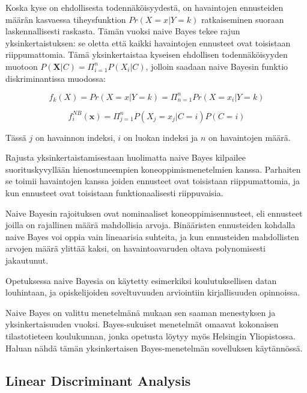 \documentclass[finnish,twoside,openright]{HYgraduMLDS}
\begin{document}
Koska kyse on ehdollisesta todennäköisyydestä, on havaintojen ennusteiden määrän kasvaessa tiheysfunktion $Pr(X = x | Y = k)$ ratkaiseminen suoraan laskennallisesti raskasta. Tämän vuoksi naive Bayes tekee rajun yksinkertaistuksen: se oletta että kaikki havaintojen ennusteet ovat toisistaan riippumattomia. Tämä yksinkertaistaa kyseisen ehdollisen todennäköisyyden muotoon $P(\textbf{X}|C) = \Pi^n_{i=1} P(X_i | C)$, jolloin saadaan naive Bayesin funktio diskriminantissa muodossa:

\begin{equation}
    f_k(X) = Pr(X = x | Y = k) = \Pi^n_{n=1} Pr(X = x_i | Y = k)
\end{equation}

\begin{equation}
    f^{NB}_i(\textbf{x}) = \Pi^n_{j=1} P(X_j=x_j | C=i) P(C=i)
\end{equation}

Tässä $j$ on havainnon indeksi, $i$ on luokan indeksi ja $n$ on havaintojen määrä. 

Rajusta yksinkertaistamisestaan huolimatta naive Bayes kilpailee suorituskyvyllään hienostuneempien koneoppimismenetelmien kanssa\cite{rish2001empirical}. Parhaiten se toimii havaintojen kanssa joiden ennusteet ovat toisistaan riippumattomia, ja kun ennusteet ovat toisistaan funktionaalisesti riippuvaisia. 

Naive Bayesin rajoituksen ovat nominaaliset koneoppimisennusteet, eli ennusteet joilla on rajallinen määrä mahdollisia arvoja. Binääristen ennusteiden kohdalla naive Bayes voi oppia vain lineaarisia suhteita, ja kun ennusteiden mahdollisten arvojen määrä ylittää kaksi, on havaintoavaruden oltava polynomisesti jakautunut\cite{rish2001empirical}.

Opetuksessa naive Bayesia on käytetty esimerkiksi koulutuksellisen datan louhintaan\cite{bhardwaj2012data}, ja opiskelijoiden soveltuvuuden arviointiin kirjallisuuden opinnoissa\cite{hellas2018predicting}.

Naive Bayes on valittu menetelmänä mukaan sen saaman menestyksen ja yksinkertaisuuden vuoksi. Bayes-sukuiset menetelmät omaavat kokonaisen tilastotieteen koulukunnan, jonka opetusta löytyy myös Helsingin Yliopistossa. Haluan nähdä tämän yksinkertaisen Bayes-menetelmän sovelluksen käytännössä.


\subsection{Linear Discriminant Analysis}
\end{document}
